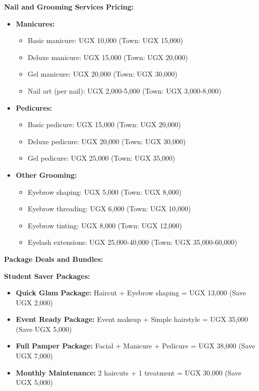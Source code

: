 \documentclass[a4paper,12pt]{article}
\begin{document}
\textbf{Nail and Grooming Services Pricing:}
\begin{itemize}[leftmargin=2em]
    \item \textbf{Manicures:}
    \begin{itemize}
        \item Basic manicure: UGX 10,000 (Town: UGX 15,000)
        \item Deluxe manicure: UGX 15,000 (Town: UGX 20,000)
        \item Gel manicure: UGX 20,000 (Town: UGX 30,000)
        \item Nail art (per nail): UGX 2,000-5,000 (Town: UGX 3,000-8,000)
    \end{itemize}
    
    \item \textbf{Pedicures:}
    \begin{itemize}
        \item Basic pedicure: UGX 15,000 (Town: UGX 20,000)
        \item Deluxe pedicure: UGX 20,000 (Town: UGX 30,000)
        \item Gel pedicure: UGX 25,000 (Town: UGX 35,000)
    \end{itemize}
    
    \item \textbf{Other Grooming:}
    \begin{itemize}
        \item Eyebrow shaping: UGX 5,000 (Town: UGX 8,000)
        \item Eyebrow threading: UGX 6,000 (Town: UGX 10,000)
        \item Eyebrow tinting: UGX 8,000 (Town: UGX 12,000)
        \item Eyelash extensions: UGX 25,000-40,000 (Town: UGX 35,000-60,000)
    \end{itemize}
\end{itemize}

\vspace{1em}

\textbf{Package Deals and Bundles:}

\textbf{Student Saver Packages:}
\begin{itemize}[leftmargin=2em]
    \item \textbf{Quick Glam Package:} Haircut + Eyebrow shaping = UGX 13,000 (Save UGX 2,000)
    \item \textbf{Event Ready Package:} Event makeup + Simple hairstyle = UGX 35,000 (Save UGX 5,000)
    \item \textbf{Full Pamper Package:} Facial + Manicure + Pedicure = UGX 38,000 (Save UGX 7,000)
    \item \textbf{Monthly Maintenance:} 2 haircuts + 1 treatment = UGX 30,000 (Save UGX 5,000)
\end{itemize}
\end{document}
